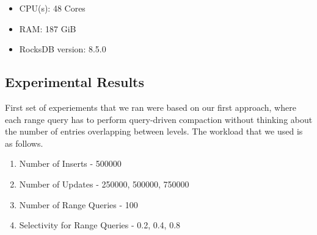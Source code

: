 \begin{itemize}
    \item CPU(s)\:: 48 Cores
    \item RAM\:: 187 GiB
    \item RocksDB version\:: 8.5.0
\end{itemize}

\subsection{Experimental Results}
First set of experiements that we ran were based on our first approach, where each range query has to 
perform query-driven compaction without thinking about the number of entries overlapping between levels. The workload that
we used is as follows.

\begin{enumerate}[leftmargin=*,labelindent=0mm, itemsep=0.2\baselineskip]
    \item Number of Inserts \-- 500000
    \item Number of Updates \-- 250000, 500000, 750000
    \item Number of Range Queries \-- 100 
    \item Selectivity for Range Queries \-- 0.2, 0.4, 0.8
\end{enumerate}



